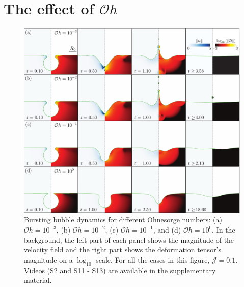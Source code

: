 \documentclass[final]{jfm}
\begin{document}
\section{The effect of $\mathcal{O}h$}\label{App::OhsVariation}
 \begin{figure}
	\centerline{\includegraphics[width=\linewidth]{FigureB1_Ohvariation-eps-converted-to.pdf}}%
	\caption{Bursting bubble dynamics for different Ohnesorge numbers: (a) $\mathcal{O}h = 10^{-3}$, (b) $\mathcal{O}h = 10^{-2}$, (c) $\mathcal{O}h = 10^{-1}$, and (d) $\mathcal{O}h = 10^{0}$. In the background, the left part of each panel shows the magnitude of the velocity field and the right part shows the deformation tensor's magnitude on a $\log_{10}$ scale. For all the cases in this figure, $\mathcal{J} = 0.1$. Videos (S2 and S11 - S13) are available in the supplementary material.}
	\label{fig:Oh_Variation}
\end{figure}
\end{document}
